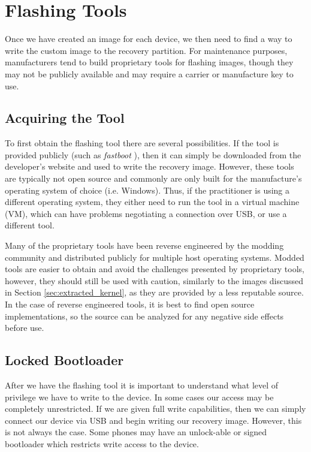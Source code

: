 \section{Flashing Tools}
\label{sec:flash_tools}

Once we have created an image for each device, we then need to find a way to write the custom image to the recovery partition.  For maintenance purposes, manufacturers tend to build proprietary tools for flashing images, though they may not be publicly available and may require a carrier or manufacture key to use.

\subsection{Acquiring the Tool}
\label{sec:acquiring_tool}

To first obtain the flashing tool there are several possibilities.  If the tool is provided publicly (such as \emph{fastboot} \cite{fastboot}), then it can simply be downloaded from the developer's website and used to write the recovery image.  However, these tools are typically not open source and commonly are only built for the manufacture's operating system of choice (i.e. Windows).  Thus, if the practitioner is using a different operating system, they either need to run the tool in a virtual machine (VM), which can have problems negotiating a connection over USB, or use a different tool.

Many of the proprietary tools have been reverse engineered \cite{sbf_flash, heimdall} by the modding community and distributed publicly for multiple host operating systems.  Modded tools are easier to obtain and avoid the challenges presented by proprietary tools, however, they should still be used with caution, similarly to the images discussed in Section \ref{sec:extracted_kernel}, as they are provided by a less reputable source.  In the case of reverse engineered tools, it is best to find open source implementations, so the source can be analyzed for any negative side effects before use.

\subsection{Locked Bootloader}
\label{sec:locked_bootloader}

After we have the flashing tool it is important to understand what level of privilege we have to write to the device.  In some cases our access may be completely unrestricted.  If we are given full write capabilities, then we can simply connect our device via USB and begin writing our recovery image.  However, this is not always the case.  Some phones may have an unlock-able or signed bootloader which restricts write access to the device.

